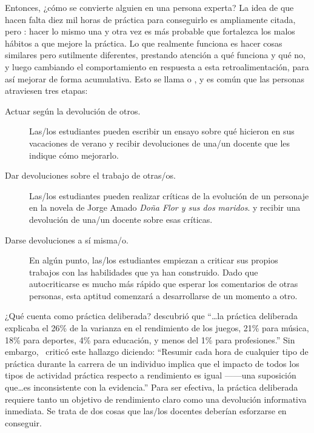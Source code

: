 
Entonces, ¿cómo se convierte alguien en una persona experta?
La idea de que hacen falta diez mil horas de práctica para conseguirlo es ampliamente citada,
pero :
hacer lo mismo una y otra vez es más probable que fortalezca los malos hábitos a que mejore la práctica.
Lo que realmente funciona es hacer cosas similares pero sutilmente diferentes,
prestando atención a qué funciona y qué no,
y luego cambiando el comportamiento en respuesta a esta retroalimentación, para así mejorar de forma acumulativa.
Esto se llama 
o ,
y es común que las personas atraviesen tres etapas:

\begin{description}

\item[Actuar según la devolución de otros.]
  Las/los estudiantes pueden escribir un ensayo sobre qué hicieron en sus vacaciones de verano
  y recibir devoluciones de una/un docente que les indique cómo mejorarlo.

\item[Dar devoluciones sobre el trabajo de otras/os.]
  Las/los estudiantes pueden realizar críticas de la evolución de un personaje en la novela de Jorge Amado \emph{Doña Flor y sus dos maridos}. 
  y recibir una devolución de una/un docente sobre esas críticas.

\item[Darse devoluciones a sí misma/o.]
  En algún punto,
  las/los estudiantes empiezan a criticar sus propios trabajos
  con las habilidades que ya han construido.
  Dado que auto\-criticarse es mucho más rápido que esperar los comentarios de otras personas, 
  esta aptitud comenzará a desarrollarse de un momento a otro.
  
\end{description}

\begin{aside}{¿Qué cuenta como práctica deliberada?}
  \cite{Macn2014} descubrió que
  ``{\ldots}la práctica deliberada explicaba el 26\% de la varianza en el rendimiento de los juegos,
  21\% para música,
  18\% para deportes,
  4\% para educación,
  y menos del 1\% para profesiones.''
  Sin embargo,~\cite{Eric2016} criticó este hallazgo diciendo:
  ``Resumir cada hora de cualquier tipo de práctica durante la carrera de un individuo
 implica que el impacto de todos los tipos de actividad práctica respecto a rendimiento es igual ------una suposición
  que{\ldots}es inconsistente con la evidencia.''
  Para ser efectiva,
  la práctica deliberada requiere tanto un objetivo de rendimiento claro
  como una devolución informativa inmediata.
  Se trata de dos cosas que las/los docentes deberían esforzarse en conseguir.
\end{aside}

